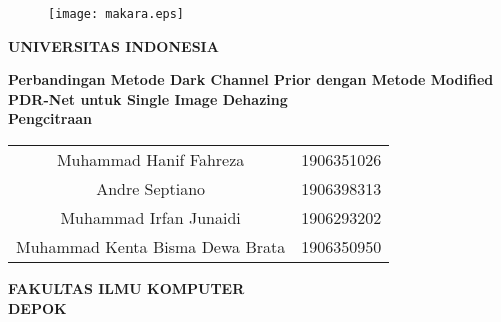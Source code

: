 \documentclass[11pt, a4paper, final]{report}
\begin{document}
\begin{titlepage}
    \begin{center}\begin{figure}
            \begin{center}
                \texttt{[image: makara.eps]}
            \end{center}
        \end{figure}    
        \vspace*{0cm}
        \textbf{
        	UNIVERSITAS INDONESIA\\
        }
        
        \vspace*{1.0cm}
        \textbf{Perbandingan Metode Dark Channel Prior dengan Metode Modified PDR-Net untuk Single Image Dehazing} \\[1.0cm]
        
        \vspace*{3 cm}
        \textbf{Pengcitraan} \\
        \vspace*{3 mm}


\begin{table}[H]
        \centering
        \begin{tabular}{c c}
            Muhammad Hanif Fahreza & 1906351026\\
            Andre Septiano & 1906398313\\
            Muhammad Irfan Junaidi & 1906293202\\
            Muhammad Kenta Bisma Dewa Brata & 1906350950
        \end{tabular}
        \end{table}
        \vspace*{5.0cm}

        \textbf{
        	FAKULTAS ILMU KOMPUTER\\
        	DEPOK
        }
    \end{center}
\end{titlepage}

\onehalfspacing

\tableofcontents
{}  

\begingroup
\listoffigures
{}  
\let\cleardoublepage\relax
\let\clearpage\relax
\listoftables
{}  
\endgroup
\end{document}
